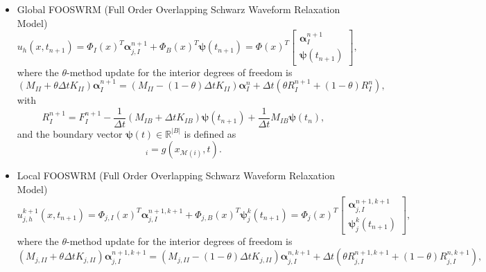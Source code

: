 \documentclass[a4paper, 11pt]{article}
\theoremstyle{remark}
\begin{document}
\begin{itemize}
    \item [--] Global FOOSWRM (Full Order Overlapping Schwarz Waveform Relaxation Model)
    \begin{equation*}
    u_{h}(x, t_{n+1}) = \Phi_{I}(x)^{T}\boldsymbol{\alpha}_{j, I}^{n+1} + \Phi_{B}(x)^{T}\boldsymbol{\psi}(t_{n+1}) = \Phi(x)^{T}
    \begin{bmatrix}
        \boldsymbol{\alpha}_{I}^{n+1}\\[1ex]
        \boldsymbol{\psi}(t_{n+1})
    \end{bmatrix},
    \end{equation*}
    where the $\theta$-method update for the interior degrees of freedom is
    \begin{equation*}
        \left(M_{II} + \theta\Delta t K_{II}\right) \boldsymbol{\alpha}_{I}^{n+1} = \left(M_{II} - (1-\theta)\Delta t K_{II}\right)\boldsymbol{\alpha}_{I}^{n} + \Delta t\left(\theta R^{n+1}_{I} + (1-\theta)R^{n}_{I}\right),
    \end{equation*}
    with
    \begin{equation*}
        R^{n+1}_{I} = F^{n+1}_{I} - \frac{1}{\Delta t}\left(M_{IB} +\Delta t K_{IB}\right)\boldsymbol{\psi}(t_{n+1}) + \frac{1}{\Delta t}M_{IB}\boldsymbol{\psi}(t_{n}),
    \end{equation*}
    and the boundary vector $\boldsymbol{\psi}(t) \in \mathbb{R}^{|B|}$ is defined as
    \begin{equation*}
        [\boldsymbol{\psi}(t)]_{i} = g(x_{\mathcal{M}(i)}, t).
    \end{equation*}
    \item [--] Local FOOSWRM (Full Order Overlapping Schwarz Waveform Relaxation Model)
    \begin{equation*}
    u^{k+1}_{j, h}(x, t_{n+1}) = \Phi_{j, I}(x)^{T}\boldsymbol{\alpha}_{j, I}^{n+1, k+1} + \Phi_{j, B}(x)^{T}\boldsymbol{\psi}_{j}^{k}(t_{n+1}) = \Phi_{j}(x)^{T}
    \begin{bmatrix}
        \boldsymbol{\alpha}_{j, I}^{n+1, k+1}\\[1ex]
        \boldsymbol{\psi}_{j}^{k}(t_{n+1})
    \end{bmatrix},
    \end{equation*}
    where the $\theta$-method update for the interior degrees of freedom is
    \begin{equation*}
        \left(M_{j, II} + \theta\Delta t K_{j, II}\right) \boldsymbol{\alpha}_{j, I}^{n+1, k+1} = \left(M_{j, II} - (1-\theta)\Delta t K_{j, II}\right)\boldsymbol{\alpha}_{j, I}^{n, k+1} + \Delta t\left(\theta R^{n+1, k+1}_{j, I} + (1-\theta)R^{n, k+1}_{j, I}\right),

\end{equation*}
\end{itemize}
\end{document}
